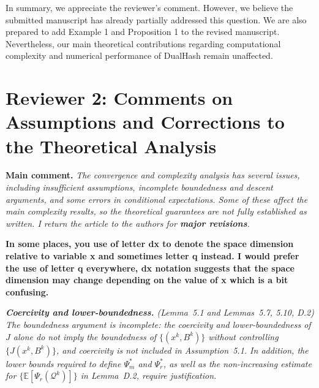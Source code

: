 \documentclass[11pt]{article}
\begin{document}
In summary, we appreciate the reviewer’s comment. However, we believe the submitted manuscript has already partially addressed this question. We are also prepared to add Example 1 and Proposition 1 to the revised manuscript. Nevertheless, our main theoretical contributions regarding computational complexity and numerical performance of DualHash remain unaffected. 


\section{Reviewer 2: Comments on Assumptions and Corrections to the Theoretical Analysis}

\vspace{0.5em}
\noindent\textbf{Main comment.} \emph{%
The convergence and complexity analysis has several issues, including
insufficient assumptions, incomplete boundedness and
descent arguments, and some errors in conditional expectations.
Some of these affect the main complexity results, so the
theoretical guarantees are not fully established as written.
I return the article to the authors for \textbf{major revisions}.}

\vspace{0.5em}
\noindent\textbullet\quad\textbf{In some places, you use of letter dx to denote the space dimension relative to variable x
and sometimes letter q instead. I would prefer the use of letter q everywhere, dx notation
suggests that the space dimension may change depending on the value of x which is a bit
confusing.}

\noindent\emph{\textbf{Coercivity and lower-boundedness.}
(Lemma~5.1 and Lemmas~5.7, 5.10, D.2)
The boundedness argument is incomplete: the coercivity and
lower-boundedness of $J$ alone do not imply the boundedness of
$\{(x^k,B^k)\}$ without controlling
$\{J(x^k,B^k)\}$, and coercivity is not included in
Assumption~5.1. In addition, the lower bounds required to define
$\Psi_m^*$ and $\Psi_r^*$, as well as the non-increasing estimate for
$\{\mathbb{E}[\Psi_r(\mathcal{Q}^k)]\}$ in Lemma~D.2, require
justification.}

\end{document}
